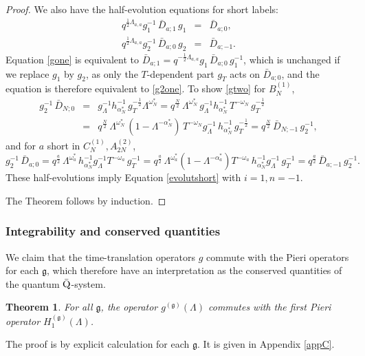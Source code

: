 \documentclass[12pt]{amsart}
\newtheorem{thm}{Theorem}[section]
\newcommand{\barQ}{$\bar{\rm Q}$}
\newcommand{\barD}{\bar D}
\newcommand{\g}{{\mathfrak{g}}}
\newcommand{\al}{{\alpha}}
\newcommand{\lL}{{\Lambda}}
\newcommand{\half}{\frac{1}{2}}
\numberwithin{equation}{section}
\begin{document}
\begin{proof}
%
%
We  also have the half-evolution equations for short labels:
%
\begin{eqnarray} q^{\half \lL_{a,a}} g_1^{-1}\, \barD_{a;1}\,g_1&=&\barD_{a;0},\label{gone}\\
q^{\half \lL_{a,a}} g_2^{-1}\, \barD_{a;0}\,g_2&=&\barD_{a;-1}.\label{gtwo}
\end{eqnarray}
%
%
Equation \eqref{gone} is equivalent to
$\barD_{a;1}=q^{-\half \lL_{a,a}}g_1 \,\barD_{a;0}\,g_1^{-1}$, which is unchanged if we replace $g_1$ by $g_2$,
as only the $T$-dependent part $g_T$ acts on $\barD_{a;0}$, and the equation is therefore equivalent to
\eqref{g2one}.
To show  \eqref{gtwo} for $B_N^{(1)}$,
\begin{eqnarray*}
g_2^{-1}\, \barD_{N;0}&=& g_\lL^{-1}h_{\al_N^*}^{-1}\,g_T^{-\half} \lL^{\omega_N^*} 
=q^{\frac{N}{2}} \,\lL^{\omega_N^*}\, g_\lL^{-1}h_{\al_N^*}^{-1}\, T^{-\omega_N} \,g_T^{-\half}\\
&=& q^{\frac{N}{2}} \,\lL^{\omega_N^*}\,(1-\lL^{-\al_N^*}) \,T^{-\omega_N}g_\lL^{-1}\,h_{\al_N^*}^{-1}\,g_T^{-\half} 
= q^{\frac{N}{2}} \,\barD_{N;-1}\, g_2^{-1} ,
\end{eqnarray*}
and for $a$ short in $C_N^{(1)},A_{2N}^{(2)}$,
\begin{equation*}
g_2^{-1}\, \barD_{a;0}= q^{\frac{a}{2}} \, \lL^{\omega_a^*}\,h_{\al_N^*}^{-1}g_\lL^{-1}  T^{-\omega_a}\, g_T^{-1} 
= q^{\frac{a}{2}} \, \lL^{\omega_a^*}(1-\lL^{-\al_a^*}) T^{-\omega_a}\,h_{\al_N^*}^{-1}g_\lL^{-1} \, g_T^{-1}
=q^{\frac{a}{2}}\, \barD_{a;-1}\,g_2^{-1} .
\end{equation*}
These half-evolutions imply Equation \eqref{evolutshort} with $i=1,n=-1$.
%

The Theorem follows by induction.
%
\end{proof}



\subsubsection{Integrability and conserved quantities}

We claim that the time-translation operators $g$ commute with the Pieri operators for each $\g$, which therefore have an interpretation as the conserved quantities of the quantum \barQ-system.
\begin{thm} \label{lemone}
For all $\g$, the operator $g^{(\g)}(\lL)$ commutes with the first Pieri operator $H_1^{(\g)}(\lL)$.
\end{thm}
The proof is by explicit calculation for each $\g$. It is given in  Appendix \ref{appC}. 
\end{document}
